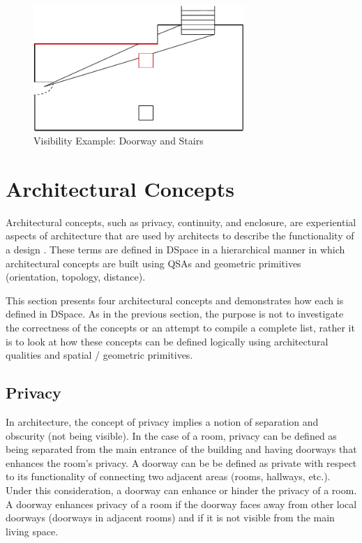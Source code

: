 \documentclass[12pt]{ucthesis}
\begin{document}
\begin{figure}[H]
\centering
\includegraphics[width=80mm]{visibility-stair-door}
\caption{Visibility Example: Doorway and Stairs}
\label{visibility-door-stair}
\end{figure}



\section{Architectural Concepts}
Architectural concepts, such as privacy, continuity, and enclosure, are experiential aspects of architecture that are used by architects to describe the functionality of a design \cite{Koile}. These terms are defined in DSpace in a hierarchical manner in which architectural concepts are built using QSAs and geometric primitives (orientation, topology, distance). 

This section presents four architectural concepts and demonstrates how each is defined in DSpace. As in the previous section, the purpose is not to investigate the correctness of the concepts or an attempt to compile a complete list, rather it is to look at how these concepts can be defined logically using architectural qualities and spatial / geometric primitives.

\subsection{Privacy}
In architecture, the concept of privacy implies a notion of separation and obscurity (not being visible). In the case of a room, privacy can be defined as being separated from the main entrance of the building and having doorways that enhances the room's privacy. A doorway can be be defined as private with respect to its functionality of connecting two adjacent areas (rooms, hallways, etc.). Under this consideration, a doorway can enhance or hinder the privacy of a room. A doorway enhances privacy of a room if the doorway faces away from other local doorways (doorways in adjacent rooms) and if it is not visible from the main living space. 
\end{document}
